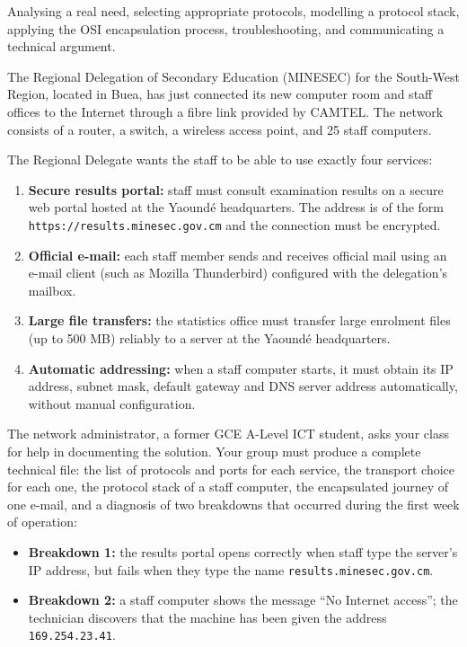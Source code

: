 \documentclass[11pt]{article}
\newcounter{popsec}
\newcounter{popsub}
\newcommand{\courssub}[1]{%
  \stepcounter{popsub}%
  \par\vspace{9pt}\noindent{\popxbold\fontsize{11.5}{13}\selectfont\color{popink}{\color{poporange}\thepopsec.\thepopsub}\hspace{6pt}#1}\par\nopagebreak\vspace{4pt}
}
\begin{document}
\begin{aretenir}
Analysing a real need, selecting appropriate protocols, modelling a protocol stack, applying the OSI encapsulation process, troubleshooting, and communicating a technical argument.
\end{aretenir}

\courssub{Situation}

\begin{experience}
The Regional Delegation of Secondary Education (MINESEC) for the South-West Region, located in Buea, has just connected its new computer room and staff offices to the Internet through a fibre link provided by CAMTEL. The network consists of a router, a switch, a wireless access point, and 25 staff computers.

The Regional Delegate wants the staff to be able to use exactly four services:

\begin{enumerate}
\item \textbf{Secure results portal:} staff must consult examination results on a secure web portal hosted at the Yaoundé headquarters. The address is of the form \texttt{https://results.minesec.gov.cm} and the connection must be encrypted.
\item \textbf{Official e-mail:} each staff member sends and receives official mail using an e-mail client (such as Mozilla Thunderbird) configured with the delegation's mailbox.
\item \textbf{Large file transfers:} the statistics office must transfer large enrolment files (up to 500 MB) reliably to a server at the Yaoundé headquarters.
\item \textbf{Automatic addressing:} when a staff computer starts, it must obtain its IP address, subnet mask, default gateway and DNS server address automatically, without manual configuration.
\end{enumerate}

The network administrator, a former GCE A-Level ICT student, asks your class for help in documenting the solution. Your group must produce a complete technical file: the list of protocols and ports for each service, the transport choice for each one, the protocol stack of a staff computer, the encapsulated journey of one e-mail, and a diagnosis of two breakdowns that occurred during the first week of operation:

\begin{itemize}
\item \textbf{Breakdown 1:} the results portal opens correctly when staff type the server's IP address, but fails when they type the name \texttt{results.minesec.gov.cm}.
\item \textbf{Breakdown 2:} a staff computer shows the message ``No Internet access''; the technician discovers that the machine has been given the address \texttt{169.254.23.41}.
\end{itemize}
\end{experience}
\end{document}
